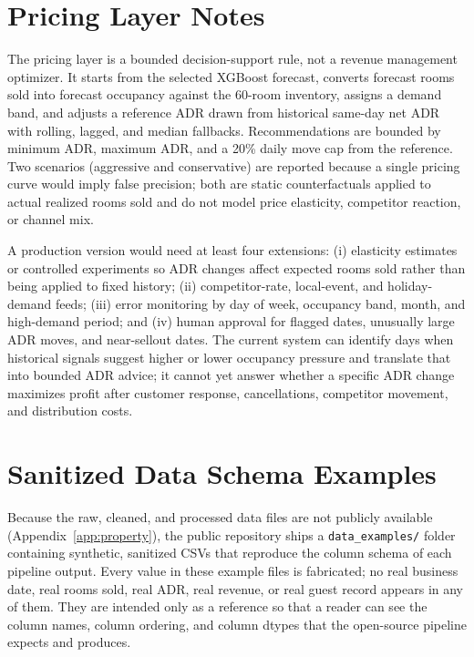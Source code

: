\documentclass[conference]{IEEEtran}
\begin{document}
\section{Pricing Layer Notes}
The pricing layer is a bounded decision-support rule, not a revenue management optimizer. It starts from the selected XGBoost forecast, converts forecast rooms sold into forecast occupancy against the 60-room inventory, assigns a demand band, and adjusts a reference ADR drawn from historical same-day net ADR with rolling, lagged, and median fallbacks. Recommendations are bounded by minimum ADR, maximum ADR, and a 20\% daily move cap from the reference. Two scenarios (aggressive and conservative) are reported because a single pricing curve would imply false precision; both are static counterfactuals applied to actual realized rooms sold and do not model price elasticity, competitor reaction, or channel mix.

A production version would need at least four extensions: (i) elasticity estimates or controlled experiments so ADR changes affect expected rooms sold rather than being applied to fixed history; (ii) competitor-rate, local-event, and holiday-demand feeds; (iii) error monitoring by day of week, occupancy band, month, and high-demand period; and (iv) human approval for flagged dates, unusually large ADR moves, and near-sellout dates. The current system can identify days when historical signals suggest higher or lower occupancy pressure and translate that into bounded ADR advice; it cannot yet answer whether a specific ADR change maximizes profit after customer response, cancellations, competitor movement, and distribution costs.

\section{Sanitized Data Schema Examples}
\label{app:examples}
Because the raw, cleaned, and processed data files are not publicly available (Appendix~\ref{app:property}), the public repository ships a \texttt{data\_examples/} folder containing synthetic, sanitized CSVs that reproduce the column schema of each pipeline output. Every value in these example files is fabricated; no real business date, real rooms sold, real ADR, real revenue, or real guest record appears in any of them. They are intended only as a reference so that a reader can see the column names, column ordering, and column dtypes that the open-source pipeline expects and produces.
\end{document}
